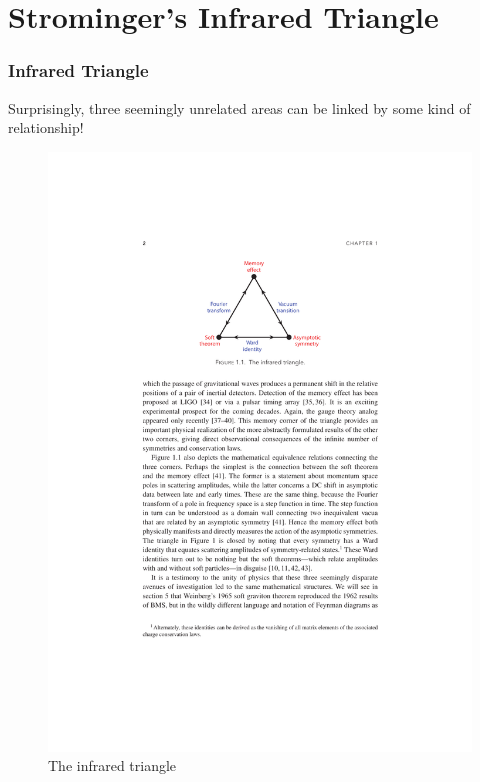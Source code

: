 \documentclass[aspectratio=169]{beamer}%
\begin{document}
	\section{Strominger's Infrared Triangle}
	\begin{frame}
		\frametitle{Infrared Triangle}
		Surprisingly, three seemingly unrelated areas can be linked by some kind of relationship!
		\begin{figure}
			\centering
			\includegraphics{./figs/3.pdf}
			\caption{The infrared triangle}
		\end{figure}
	\end{frame}
\end{document}
